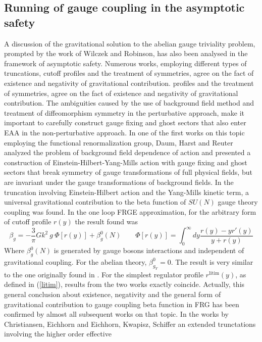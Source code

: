 \documentclass[11pt, a4paper]{article}
\begin{document}
\subsection{Running of gauge coupling in the asymptotic safety}
A discussion of the gravitational solution to the abelian gauge triviality problem, prompted by the work of Wilczek and Robinson,
has also been analysed in the framework of asymptotic safety. Numerous works, employing different types of truncations, cutoff
profiles and the treatment of symmetries, agree on the fact of existence and negativity of gravitational contribution.
profiles and the treatment of symmetries, agree on the fact of existence and negativity of gravitational contribution.
The ambiguities caused by the use of background field method and treatment
of diffeomorphism symmetry in the perturbative approach, make it important to carefully construct 
gauge fixing and ghost sectors that also enter EAA in the non-perturbative approach.
In one of the first works on this topic employing the functional renormalization group, Daum, Harst and Reuter \cite{reuter_abelian}
analyzed the problem of background field dependence of action and
presented a construction of Einstein-Hilbert-Yang-Mills action with gauge fixing and ghost sectors that
break symmetry of gauge transformations of full physical fields, but are invariant under the gauge
transformations of background fields. In the truncation involving Einstein-Hilbert action and the Yang-Mills kinetic term,
a universal gravitational contribution to the beta function of $SU(N)$ gauge theory coupling was found.
In the one loop FRGE approximation, for the arbitrary form of cutoff profile $r(y)$ the result found was
\begin{equation}
    \beta_g = - \frac{3}{\pi} Gk^2 \ g \ \Phi[r(y)] + \beta_g^0(N) \qquad \Phi[r(y)] = \int_0^{\infty} dy \frac{r(y) - y r'(y)}{y+r(y)}
\end{equation}
Where $\beta_g^0(N)$ is generated by gauge bosons interactions and independent of gravitational coupling. For the abelian theory, $\beta_{g_{Y}}^0 = 0$. The result is very similar to the one originally found in \cite{wilczek}.
For the simplest regulator profile $r^{\text{litim}}(y)$, as defined in (\ref{litim}), results from the two works exactly coincide.
Actually, this general conclusion about existence, negativity and the general form of gravitational contribution to 
gauge coupling beta function in FRG has been confirmed by almost all subsequent works on that topic.
In the works by Christiansen, Eichhorn \cite{christiansen_eichhorn} and Eichhorn, Kwapisz, Schiffer \cite{kwapisz_eichhorn} an extended trunctations involving the higher order effective
\end{document}
